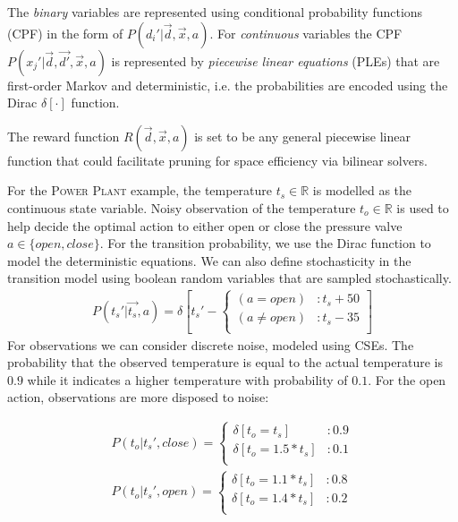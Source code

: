 \documentclass{article}
\begin{document}
The \emph{binary} variables are represented using conditional probability functions (CPF) in the form of $P(d_i'|\vec{d},\vec{x},a)$. For \emph{continuous} variables
the CPF $P(x_j'|\vec{d},\vec{d'},\vec{x},a)$ is represented by \emph{piecewise
linear equations} (PLEs) that are first-order Markov and deterministic, i.e. the probabilities are encoded using the Dirac $\delta[\cdot]$ function. 

The reward function $R(\vec{d},\vec{x},a)$ is set to be any general piecewise linear  function that could facilitate pruning for space efficiency via bilinear solvers. 

For the \textsc{Power Plant} example, the temperature $t_s \in \mathbb{R}$ is modelled as the continuous state variable. Noisy observation of the temperature $t_o \in \mathbb{R}$ is used to help decide the optimal action to either open or close the pressure valve $a \in \{open,close\}$. 
For the transition probability, we use the Dirac function to model the deterministic equations. We can also define stochasticity in the transition model using boolean random variables that are sampled stochastically.  
\begin{align}
P(t_s'|\vec{t_s},a)= \delta\left[ t_s' - 
\begin{cases}
 (a=open) &: t_s + 50 \\ 
(a \neq open) &: t_s - 35 \\
\end{cases}
\right]\nonumber
\end{align}
For observations we can consider discrete noise, modeled using CSEs. The probability that the observed temperature is equal to the actual temperature is $0.9$  while it indicates a higher temperature with probability of $0.1$. For the open action, observations are more disposed to noise: 

\begin{align}
P(t_o|t_s',close) = 
\begin{cases}
 \delta\left[ t_o=t_s \right] &: 0.9 \\
 \delta\left[ t_o=1.5*t_s \right] &: 0.1 \\
\end{cases}
\\
P(t_o|t_s',open) = 
\begin{cases}
 \delta\left[ t_o=1.1*t_s \right] &: 0.8 \\
 \delta\left[ t_o=1.4*t_s \right] &: 0.2 \\
\end{cases}
\end{align}
\end{document}
